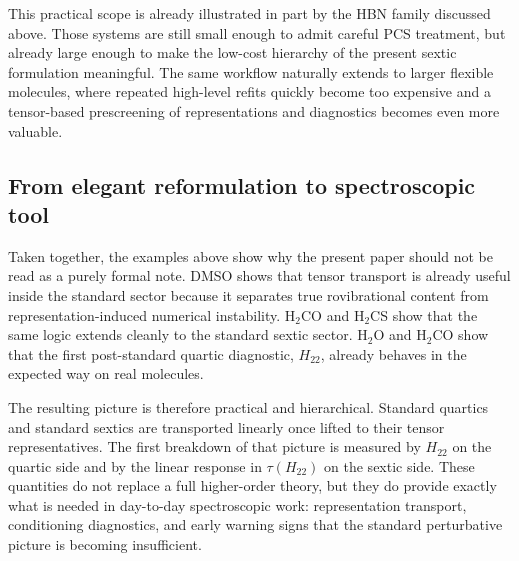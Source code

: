 \documentclass[aip,jcp,reprint,floatfix]{revtex4-2}
\begin{document}
This practical scope is already illustrated in part by the HBN family
discussed above. Those systems are still small enough to admit careful PCS
treatment, but already large enough to make the low-cost hierarchy of the
present sextic formulation meaningful. The same workflow naturally extends to
larger flexible molecules, where repeated high-level refits quickly become
too expensive and a tensor-based prescreening of representations and
diagnostics becomes even more valuable.

\subsection{From elegant reformulation to spectroscopic tool}

Taken together, the examples above show why the present paper should not be
read as a purely formal note. DMSO shows that tensor transport is already
useful inside the standard sector because it separates true rovibrational
content from representation-induced numerical instability. H$_2$CO and
H$_2$CS show that the same logic extends cleanly to the standard sextic
sector. H$_2$O and H$_2$CO show that the first post-standard quartic
diagnostic, $H_{22}$, already behaves in the expected way on real molecules.

The resulting picture is therefore practical and hierarchical. Standard
quartics and standard sextics are transported linearly once lifted to their
tensor representatives. The first breakdown of that picture is measured by
$H_{22}$ on the quartic side and by the linear response in $\tau(H_{22})$ on
the sextic side. These quantities do not replace a full higher-order theory,
but they do provide exactly what is needed in day-to-day spectroscopic work:
representation transport, conditioning diagnostics, and early warning signs
that the standard perturbative picture is becoming insufficient.
\end{document}
